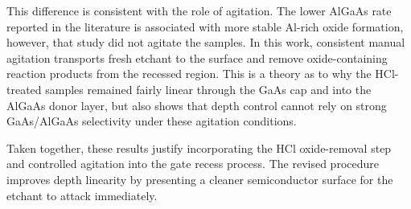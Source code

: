 \vspace{1mm}

This difference is consistent with the role of agitation. The lower AlGaAs rate
reported in the literature is associated with more stable Al-rich oxide
formation, however, that study did not agitate the samples. In this work, consistent
manual agitation transports fresh etchant to the surface and remove
oxide-containing reaction products from the recessed region. This is a theory as to why the 
HCl-treated samples remained fairly linear through the GaAs cap and into the AlGaAs donor layer, but also shows
that depth control cannot rely on strong GaAs/AlGaAs selectivity under these
agitation conditions.

Taken together, these results justify incorporating the HCl oxide-removal step
and controlled agitation into the gate recess process. The revised procedure
improves depth linearity by presenting a cleaner semiconductor surface for the
etchant to attack immediately.

\vspace{1mm}

\FloatBarrier
